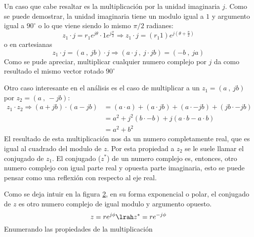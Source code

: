     Un caso que cabe resaltar es la multiplicación por la unidad imaginaria $j$. Como se puede demostrar, la unidad imaginaria tiene un modulo igual a $1$ y argumento igual a $90^{\circ}$ o lo que viene siendo lo mismo $\pi/2$ radianes:
    \begin{equation}
        z_1\cdot j = r_1e^{j\theta}\cdot 1e^{j\frac{\pi}{2}} \Longrightarrow z_1\cdot j = (r_1 1)e^{j(\theta+\frac{\pi}{2})}
    \end{equation}
    o en cartesianas
    \begin{equation}
        z_1\cdot j = (a\ , \ jb)\cdot j \Longrightarrow (a\cdot j\ ,\ j\cdot jb)=(-b\ ,\ ja)
    \end{equation}
   Como se pude apreciar, multiplicar cualquier numero complejo por $j$ da como resultado el mismo vector rotado $90^{\circ}$
   \begin{figure}[H]
       \centering
       
       \label{fig:MultiC}
   \end{figure}
    Otro caso interesante en el análisis es el caso de multiplicar a un $z_1=(a\ ,\ jb)$ por $z_2=(a\ ,\ -jb)$:
    \begin{equation}
    \begin{aligned}
        z_1\cdot z_2 \Rightarrow (a+jb)\cdot(a-jb)&=(a\cdot a)+(a\cdot jb)+(a\cdot -jb)+(jb\cdot -jb)\\
             &=a^2+j^2(b\cdot -b)+j(a\cdot b-a\cdot b)\\
             &=a^2+b^2
    \end{aligned}
    \end{equation}
    El resultado de esta multiplicación nos da un numero completamente real, que es igual al cuadrado del modulo de $z$. Por esta propiedad a $z_2$ se le suele llamar el conjugado de $z_1$. El conjugado ($z^*$) de un numero complejo es, entonces, otro numero complejo con igual parte real y opuesta parte imaginaria, esto se puede pensar como una reflexión con respecto al eje real.
    \begin{figure}[H]
        \centering
        
        \label{fig:ConjC}
    \end{figure}
    Como se deja intuir en la figura \ref{fig:ConjC}, en su forma exponencial o polar, el conjugado de $z$ es otro numero complejo de igual modulo y argumento opuesto.
    \begin{equation}
       z= re^{j\phi} \lrah z^*= re^{-j\phi}
    \end{equation}
    Enumerando las propiedades de la multiplicación 
